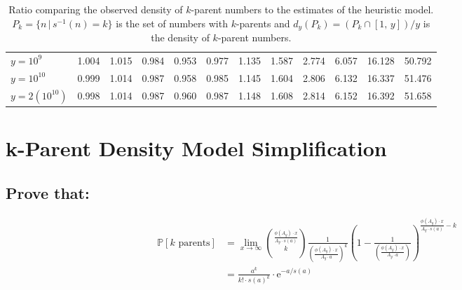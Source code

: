 \documentclass{article}
\theoremstyle{definition}
\begin{document}
\begin{table}[h!]
{\begin{tabular}{l | lllllllllll}
            $y = 10^{9}$            & 1.004                       & 1.015                       & 0.984                       & 0.953                       & 0.977                       & 1.135                       & 1.587                       & 2.774                       & 6.057                       & 16.128                      & 50.792                       \\
            $y = 10^{10}$           & 0.999                       & 1.014                       & 0.987                       & 0.958                       & 0.985                       & 1.145                       & 1.604                       & 2.806                       & 6.132                       & 16.337                      & 51.476                       \\
            $y = 2(10^{10})$        & 0.998                       & 1.014                       & 0.987                       & 0.960                       & 0.987                       & 1.148                       & 1.608                       & 2.814                       & 6.152                       & 16.392                      & 51.658
        \end{tabular}
    }
    \label{tab:densitycomparision}
    \caption{Ratio comparing the observed density of $k$-parent numbers to the estimates of the heuristic model. $P_k = \{n \,|\, s^{-1}(n) = k\}$ is the set of numbers with $k$-parents and $d_y(P_k) = (P_k \cap [1,\,y]) / y$ is the density of $k$-parent numbers.}
\end{table}

\section{k-Parent Density Model Simplification}
\subsection*{Prove that:}
\begin{align*}
    \mathbb{P}[k \text{ parents}] & =  \lim_{x \to \infty}{\frac{\phi(A_y) \cdot x}{A_y \cdot s(a)} \choose k } \frac{1}{\left(\frac{\phi(A_y) \cdot x}{ A_y \cdot a}\right)^k} \left(1- \frac{1}{\left(\frac{\phi(A_y) \cdot x}{ A_y \cdot a}\right)}\right)^{\frac{\phi(A_y) \cdot x}{A_y \cdot s(a)  } -k} \\
                                  & = \frac{a^{k}}{k! \cdot s(a)^k} \cdot \text{e}^{-a/s(a)}
\end{align*}
\end{document}
